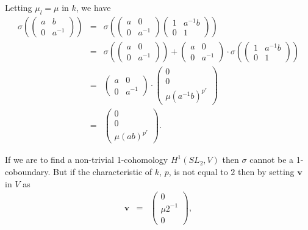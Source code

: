Letting $\mu_l = \mu$ in $k$, we have
\begin{eqnarray*}
\sigma\left(
	\left(\begin{matrix} a & b \\ 0 & a^{-1}\end{matrix}\right)
\right) &=&
\sigma\left(
	\left(\begin{matrix} a & 0 \\ 0 & a^{-1}\end{matrix}\right)
	\left(\begin{matrix} 1 & a^{-1}b \\ 0 & 1\end{matrix}\right)
\right) \\
&=&
\sigma\left(
	\left(\begin{matrix} a & 0 \\ 0 & a^{-1}\end{matrix}\right)
\right) +
\left(\begin{matrix} a & 0 \\ 0 & a^{-1}\end{matrix}\right) \cdot
\sigma\left(
	\left(\begin{matrix} 1 & a^{-1}b \\ 0 & 1\end{matrix}\right)
\right) \\
&=&
\left(\begin{matrix} a & 0 \\ 0 & a^{-1}\end{matrix}\right) \cdot
\left(\begin{matrix} 0 \\ 0 \\ \mu(a^{-1}b)^{p^{r}}\end{matrix}\right) \\
&=&
\left(\begin{matrix} 0 \\ 0 \\ \mu(ab)^{p^{r}}\end{matrix}\right).
\end{eqnarray*}

If we are to find a non-trivial 1-cohomology $H^1(SL_2, V)$ then $\sigma$ cannot be a 1-coboundary. But if the characteristic of $k$, $p$, is not equal to $2$ then by setting $\mathbf{v}$ in $V$ as
\begin{eqnarray*}
\mathbf{v} &=& \left(\begin{matrix} 0 \\ \mu2^{-1} \\ 0 \end{matrix}\right),
\end{eqnarray*}

